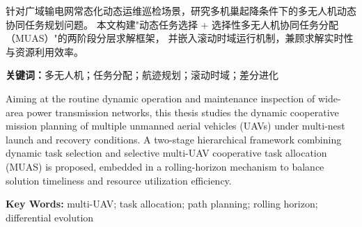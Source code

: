 
\clearpage
\cnabstracttitle
{}    %

针对广域输电网常态化动态运维巡检场景，研究多机巢起降条件下的多无人机动态协同任务规划问题。
本文构建"动态任务选择 + 选择性多无人机协同任务分配（MUAS）"的两阶段分层求解框架，
并嵌入滚动时域运行机制，兼顾求解实时性与资源利用效率。

\vspace{12pt}
\noindent\textbf{关键词：}多无人机；任务分配；航迹规划；滚动时域；差分进化

\clearpage
\enabstracttitle
{}  %

Aiming at the routine dynamic operation and maintenance inspection of wide-area
power transmission networks, this thesis studies the dynamic cooperative mission
planning of multiple unmanned aerial vehicles (UAVs) under multi-nest launch and
recovery conditions. A two-stage hierarchical framework combining dynamic task
selection and selective multi-UAV cooperative task allocation (MUAS) is proposed,
embedded in a rolling-horizon mechanism to balance solution timeliness and resource
utilization efficiency.

\vspace{12pt}
\noindent\textbf{Key Words:} multi-UAV; task allocation; path planning; rolling horizon; differential evolution

